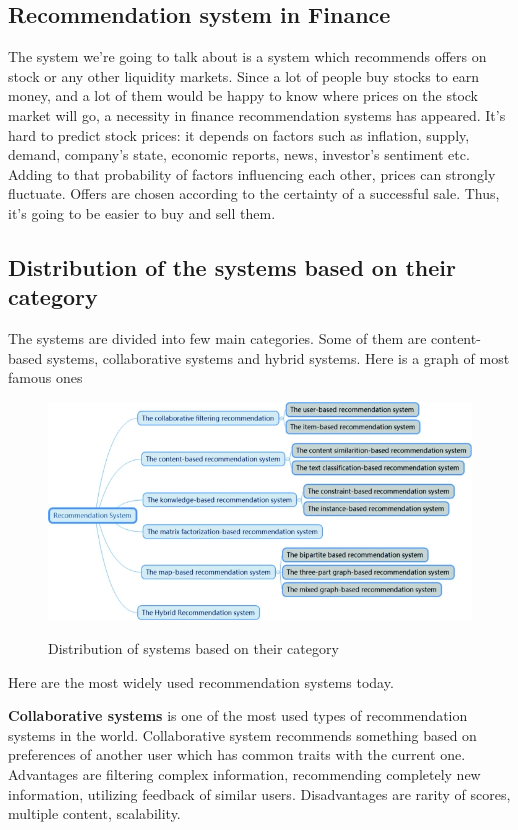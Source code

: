 \documentclass[10pt,twoside,english,a4paper]{article}
\begin{document}
\subsection{Recommendation system in Finance}
\par  The system we're going to talk about is a system which recommends offers on stock or any other liquidity markets. Since a lot of people buy stocks to earn money, and a lot of them would be happy to know where prices on the stock market will go, a necessity in finance recommendation systems has appeared. It's hard to predict stock prices: it depends on factors such as inflation, supply, demand, company's state, economic reports, news, investor's sentiment etc. Adding to that probability of factors influencing each other, prices can strongly fluctuate. Offers are chosen according to the certainty of a successful sale. Thus, it's going to be easier to buy and sell them.\cite{stock_rec}\cite{stock_prices}

\subsection{Distribution of the systems based on their category}
The systems are divided into few main categories. Some of them are content-based systems, collaborative systems and hybrid systems. Here is a graph of most famous ones
\begin{figure}[h]
\centering
\includegraphics[width=1\textwidth]{system_vars}
\caption{Distribution of systems based on their category}\cite{wang2019review}
\label{fig:System categories}
\end{figure}


Here are the most widely used recommendation systems today.
\par \textbf{Collaborative systems} is one of the most used types of recommendation systems in the world. Collaborative system recommends something based on preferences of another user which has common traits with the current one. Advantages are filtering complex information, recommending completely new information, utilizing feedback of similar users. Disadvantages are rarity of scores, multiple content, scalability.
\end{document}
